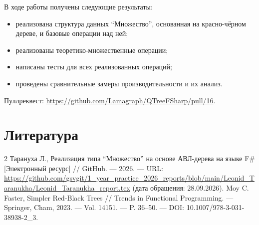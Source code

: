 \documentclass[a4paper]{article}
\begin{document}
В ходе работы получены следующие результаты:
\begin{itemize}
    \item реализована структура данных \enquote{Множество}, основанная на красно-чёрном дереве, и базовые операции над ней;
    \item реализованы теоретико-множественные операции;
    \item написаны тесты для всех реализованных операций;
    \item проведены сравнительные замеры производительности и их анализ.
\end{itemize}

Пуллреквест: \url{https://github.com/Lamagraph/QTreeFSharp/pull/16}.



\section{Литература}
\begin{thebibliography}{2}
    Тарануха Л., Реализация типа \enquote{Множество} на основе АВЛ-дерева на языке F\# [Электронный ресурс] // GitHub. --- 2026. --- URL: \url{https://github.com/gsvgit/1_year_practice_2026_reports/blob/main/Leonid_Taranukha/Leonid_Taranukha_report.tex} (дата обращения: 28.09.2026).
    Moy C. Faster, Simpler Red-Black Trees // Trends in Functional Programming. --- Springer, Cham, 2023. --- Vol. 14151. --- P. 36--50. --- DOI: 10.1007/978-3-031-38938-2\_3.
\end{thebibliography}
\end{document}
